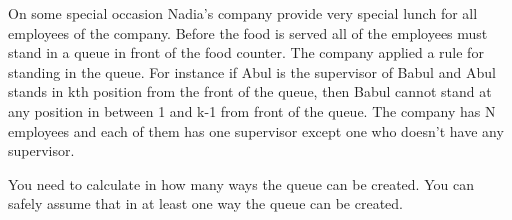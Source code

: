 On some special occasion Nadia’s company provide very special lunch for all employees of the company. Before the food is served all of the employees must stand in a queue in front of the food counter. The company applied a rule for standing in the queue. For instance if Abul is the supervisor of Babul and Abul stands in kth position from the front of the queue, then Babul cannot stand at any position in between 1 and k-1 from front of the queue. The company has N employees and each of them has one supervisor except one who doesn’t have any supervisor.  

   You need to calculate in how many ways the queue can be created. You can safely assume that in at least one way the queue can be created.  

\